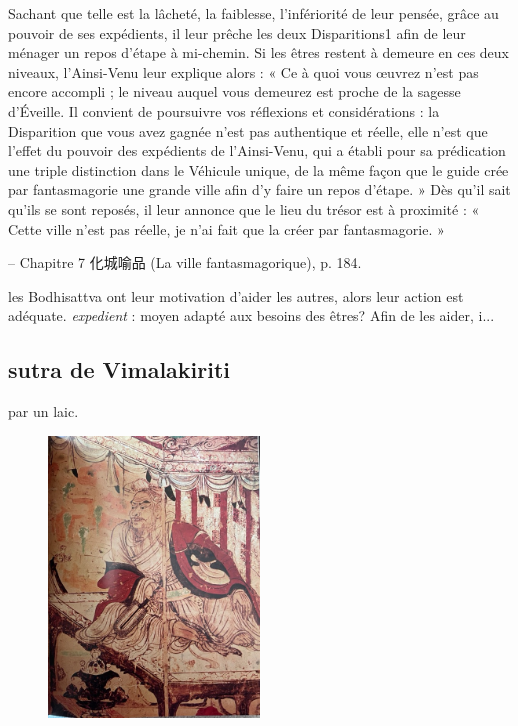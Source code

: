\begin{singlequote}
Sachant que telle est la lâcheté, la faiblesse, l’infériorité de leur pensée, grâce au pouvoir de ses expédients, il leur prêche les deux Disparitions1 afin de leur ménager un repos d’étape à mi-chemin. Si les êtres restent à demeure en ces deux niveaux, l’Ainsi-Venu leur explique alors :
« Ce à quoi vous œuvrez n’est pas encore accompli ; le niveau auquel vous demeurez est proche de la sagesse d’Éveille. Il convient de poursuivre vos réflexions et considérations : la Disparition que vous avez gagnée n’est pas authentique et réelle, elle n’est que l’effet du pouvoir des expédients de l’Ainsi-Venu, qui a établi pour sa prédication une triple distinction dans le Véhicule unique, de la même façon que le guide crée par fantasmagorie une grande ville afin d’y faire un repos d’étape. » Dès qu’il sait qu’ils se sont reposés, il leur annonce que le lieu du trésor est à proximité : « Cette ville n’est pas réelle, je n’ai fait que la créer par fantasmagorie. »

-- Chapitre 7 化城喻品 (La ville fantasmagorique), p. 184.
\end{singlequote}

\begin{Ex}
    les Bodhisattva ont leur motivation d'aider les autres, alors leur action est adéquate. \textit{expedient} : moyen adapté aux besoins des êtres? Afin de les aider, i...
\end{Ex}

\subsection{sutra de Vimalakiriti} par un laic.
\begin{figure}
    \centering
        \includegraphics[width=0.5\textwidth]{ConfucianismeTaoismeBouddhismeChinois/Images/BouddhaMahayana.jpg}

    \label{fig:enter-label}
\end{figure}

